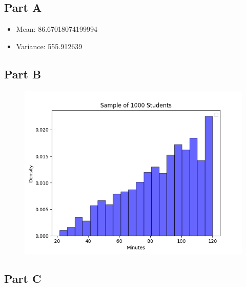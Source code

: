 \documentclass[]{report}
\begin{document}
	
	
		\subsection{Part A}
		
		\begin{itemize}
			\item Mean: 86.67018074199994
			
			\item Variance:  555.912639
			
			
			
		\end{itemize}
		
		\subsection{Part B}
			
			\begin{figure}[H]
				\centering
				\includegraphics[width=1\linewidth]{pics/4.b}
				\caption{}
				\label{fig:6}
			\end{figure}
			
		
		
		\subsection{Part C}
		
\end{document}
